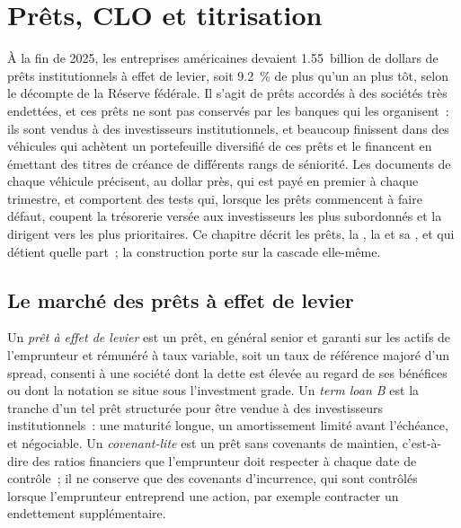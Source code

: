 \chapter{Prêts, CLO et titrisation}\label{ch:m2:loans-clos-and-securitisation}

À la fin de 2025, les entreprises américaines devaient 1.55~billion de dollars de prêts institutionnels
à effet de levier, soit 9.2~\% de plus qu'un an plus tôt, selon le décompte de la Réserve fédérale.
Il s'agit de prêts accordés à des sociétés très endettées, et ces prêts ne sont pas conservés par les banques qui les organisent~:
ils sont vendus à des investisseurs institutionnels, et beaucoup finissent dans des véhicules qui achètent un
portefeuille diversifié de ces prêts et le financent en émettant des titres de créance de différents rangs de séniorité. Les documents de chaque véhicule précisent, au dollar près, qui est payé en premier à chaque
trimestre, et comportent des tests qui, lorsque les prêts commencent à faire défaut, coupent la trésorerie
versée aux investisseurs les plus subordonnés et la dirigent vers les plus prioritaires. Ce chapitre décrit les
prêts, la , la  et sa , et qui
détient quelle part~; la construction porte sur la cascade elle-même.

\section{Le marché des prêts à effet de levier}

\begin{definition}\label{def:m2:loans-clos-and-securitisation:loan}
Un \emph{prêt à effet de levier} est un prêt, en général senior et garanti sur
les actifs de l'emprunteur et rémunéré à taux variable, soit un taux de référence majoré d'un spread, consenti à une société
dont la dette est élevée au regard de ses bénéfices ou dont la notation se situe sous l'investment grade.
Un \emph{term loan B} est la tranche d'un tel prêt structurée pour être
vendue à des investisseurs institutionnels~: une maturité longue, un amortissement limité avant l'échéance, et
négociable. Un \emph{covenant-lite} est un prêt sans
covenants de maintien, c'est-à-dire des ratios financiers que l'emprunteur doit respecter à chaque date de contrôle~; il ne conserve que
des covenants d'incurrence, qui sont contrôlés lorsque l'emprunteur entreprend une action, par exemple
contracter un endettement supplémentaire.
\end{definition}

